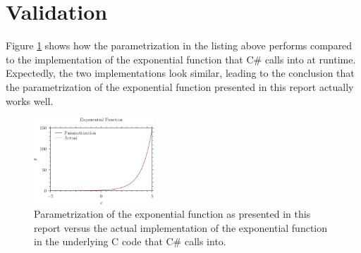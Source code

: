\documentclass[twocolumn,a4paper]{article}
\begin{document}
\section{Validation}
Figure \ref{fig:e} shows how the parametrization in the listing above performs compared to the implementation of the exponential function that C\# calls into at runtime. Expectedly, the two implementations look similar, leading to the conclusion that the parametrization of the exponential function presented in this report actually works well.
\begin{figure}[h]
    \includegraphics[width=0.4\textwidth]{out.png}
    \caption{Parametrization of the exponential function as presented in this report versus the actual implementation of the exponential function in the underlying C code that C\# calls into.}
    \label{fig:e}
\end{figure}
\end{document}

